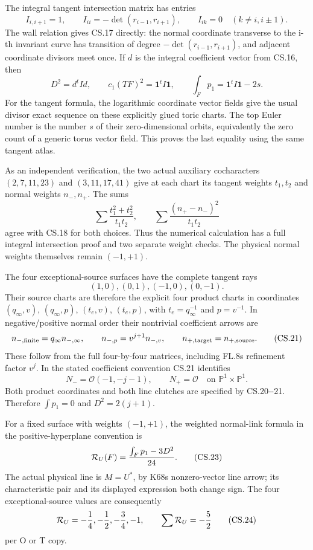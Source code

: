 The integral tangent intersection matrix has entries
\[
 I_{i,i+1}=1,\qquad
 I_{ii}=-\det(r_{i-1},r_{i+1}),\qquad
 I_{ik}=0\quad(k\ne i,i\pm1).
 \tag{CS.17}
\]
The wall relation gives CS.17 directly: the normal
coordinate transverse to the i-th invariant curve
has transition of degree
\(-\det(r_{i-1},r_{i+1})\), and adjacent coordinate
divisors meet once. If \(d\) is the integral
coefficient vector from CS.16, then
\[
 D^2=d^tId,\qquad
 c_1(TF)^2=\mathbf1^tI\mathbf1,\qquad
 \int_Fp_1=\mathbf1^tI\mathbf1-2s.
 \tag{CS.18}
\]
For the tangent formula, the logarithmic coordinate
vector fields give the usual divisor exact sequence
on these explicitly glued toric charts. The top
Euler number is the number \(s\) of their zero-dimensional
orbits, equivalently the zero count of a generic
torus vector field. This proves the last equality
using the same tangent atlas.

As an independent verification, the two actual
auxiliary cocharacters \((2,7,11,23)\) and
\((3,11,17,41)\) give at each chart its tangent weights
\(t_1,t_2\) and normal weights \(n_-,n_+\).
The sums
\[
 \sum\frac{t_1^2+t_2^2}{t_1t_2},
 \qquad
 \sum\frac{(n_+-n_-)^2}{t_1t_2}
 \tag{CS.19}
\]
agree with CS.18 for both choices. Thus the numerical
calculation has a full integral intersection proof
and two separate weight checks. The physical normal
weights themselves remain \((-1,+1)\).

The four exceptional-source surfaces have the
complete tangent rays
\[
 (1,0),(0,1),(-1,0),(0,-1).
 \tag{CS.20}
\]
Their source charts are therefore the explicit four
product charts in coordinates \((q_\infty,v)\),
\((q_\infty,p)\), \((t_e,v)\), \((t_e,p)\), with
\(t_e=q_\infty^{-1}\) and \(p=v^{-1}\).
In negative/positive normal order their nontrivial
coefficient arrows are
\[
 n_{-,{\rm finite}}=q_\infty n_{-,\infty},
 \qquad
 n_{-,p}=v^{j+1}n_{-,v},\qquad
 n_{+,{\rm target}}=n_{+,{\rm source}}.
 \tag{CS.21}
\]
These follow from the full four-by-four matrices,
including FL.8\textquotesingle s refinement factor \(v^j\). In the
stated coefficient convention CS.21 identifies
\[
 N_-=\mathcal O(-1,-j-1),\qquad N_+=\mathcal O
 \quad\text{on }\mathbb P^1\times\mathbb P^1.
 \tag{CS.22}
\]
Both product coordinates and both line clutches are
specified by CS.20-\/-21. Therefore
\(\int p_1=0\) and \(D^2=2(j+1)\).

For a fixed surface with weights \((-1,+1)\), the
weighted normal-link formula in the positive-hyperplane
convention is
\[
 {\cal R}_U(F)=\frac{\int_Fp_1-3D^2}{24}.
 \tag{CS.23}
\]
The actual physical line is \(M=U^*\), by K68\textquotesingle s
nonzero-vector line arrow; its characteristic pair
and its displayed expression both change sign.
The four exceptional-source values are consequently
\[
 {\cal R}_U=-\frac14,-\frac12,-\frac34,-1,
 \qquad \sum {\cal R}_U=-\frac52
 \tag{CS.24}
\]
per O or T copy.

